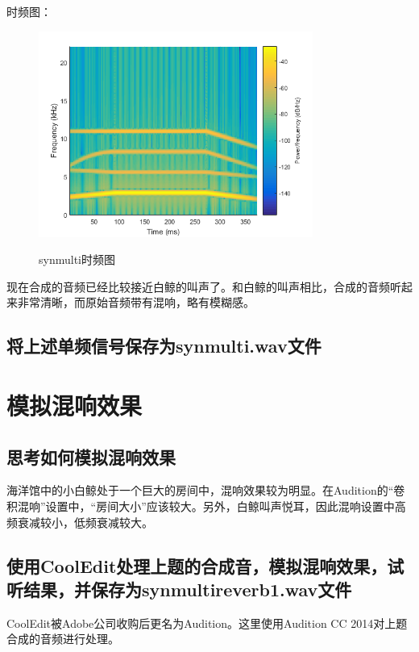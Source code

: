 \documentclass{article}
\begin{document}
            时频图：
            \begin{figure}[htb]
                \centering
                \includegraphics[width=9cm]{figure12.png}
                \label{fig:synmulti-ft}\caption{synmulti时频图}
            \end{figure}

            现在合成的音频已经比较接近白鲸的叫声了。和白鲸的叫声相比，合成的音频听起来非常清晰，而原始音频带有混响，略有模糊感。

        \subsection{将上述单频信号保存为synmulti.wav文件}

    \section{模拟混响效果}
        \subsection{思考如何模拟混响效果}
            海洋馆中的小白鲸处于一个巨大的房间中，混响效果较为明显。在Audition的“卷积混响”设置中，“房间大小”应该较大。另外，白鲸叫声悦耳，因此混响设置中高频衰减较小，低频衰减较大。

        \subsection{使用CoolEdit处理上题的合成音，模拟混响效果，试听结果，并保存为synmultireverb1.wav文件}
            CoolEdit被Adobe公司收购后更名为Audition。这里使用Audition CC 2014对上题合成的音频进行处理。
\end{document}
